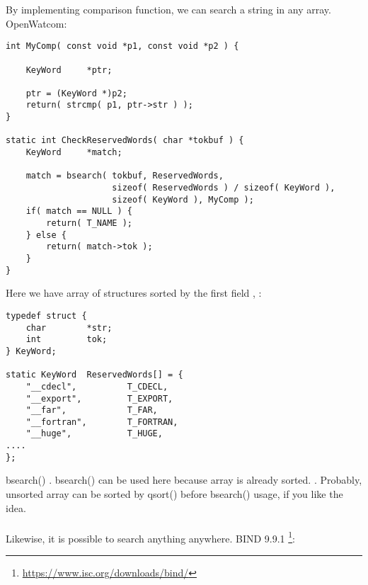 {By implementing comparison function, we can search a string in any array}.
 OpenWatcom:

\begin{lstlisting}[caption=\textbackslash{}bld\textbackslash{}pbide\textbackslash{}defgen\textbackslash{}scan.c]
int MyComp( const void *p1, const void *p2 ) {

    KeyWord     *ptr;

    ptr = (KeyWord *)p2;
    return( strcmp( p1, ptr->str ) );
}

static int CheckReservedWords( char *tokbuf ) {
    KeyWord     *match;

    match = bsearch( tokbuf, ReservedWords,
                     sizeof( ReservedWords ) / sizeof( KeyWord ),
                     sizeof( KeyWord ), MyComp );
    if( match == NULL ) {
        return( T_NAME );
    } else {
        return( match->tok );
    }
}
\end{lstlisting}

{Here we have array of structures sorted by the first field} ,
:

\begin{lstlisting}[caption=\textbackslash{}bld\textbackslash{}pbide\textbackslash{}defgen\textbackslash{}scan.c]
typedef struct {
    char        *str;
    int         tok;
} KeyWord;

static KeyWord  ReservedWords[] = {
    "__cdecl",          T_CDECL,
    "__export",         T_EXPORT,
    "__far",            T_FAR,
    "__fortran",        T_FORTRAN,
    "__huge",           T_HUGE,
....
};
\end{lstlisting}

bsearch() .
{bsearch() can be used here because array is already sorted}.
.
{Probably, unsorted array can be sorted by qsort() before bsearch() usage, if you like the idea}. \\
\\
{Likewise, it is possible to search anything anywhere}.
 BIND 9.9.1
\footnote{\url{https://www.isc.org/downloads/bind/}}:

